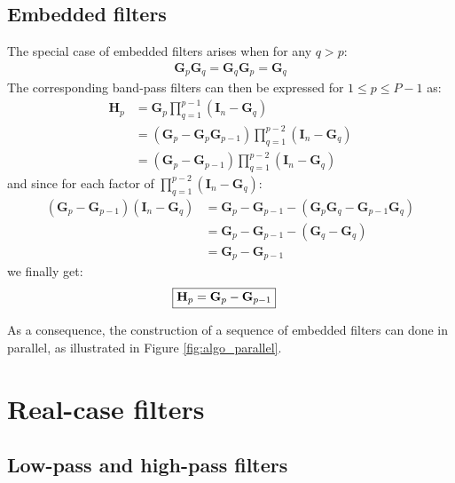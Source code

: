 \documentclass[12pt]{scrartcl}
\begin{document}
\subsection{Embedded filters}
The special case of embedded filters arises when for any $q > p$:
\begin{align}
\label{eq:embedded}
\mathbf{G}_p \mathbf{G}_q = \mathbf{G}_q \mathbf{G}_p = \mathbf{G}_q
\end{align}
The corresponding band-pass filters can then be expressed for $1 \le p \le P-1$ as:
\begin{align}
\mathbf{H}_p & = \mathbf{G}_p \prod_{q=1}^{p-1} \left(\mathbf{I}_n - \mathbf{G}_q\right) \nonumber \\
& = \left(\mathbf{G}_p - \mathbf{G}_p \mathbf{G}_{p-1}\right) \prod_{q=1}^{p-2} \left(\mathbf{I}_n - \mathbf{G}_q\right) \nonumber \\
& = \left(\mathbf{G}_p - \mathbf{G}_{p-1}\right) \prod_{q=1}^{p-2} \left(\mathbf{I}_n - \mathbf{G}_q\right)
\end{align}
and since for each factor of $\displaystyle \prod_{q=1}^{p-2} \left(\mathbf{I}_n - \mathbf{G}_q\right)$:
\begin{align}
\left(\mathbf{G}_p - \mathbf{G}_{p-1}\right) \left(\mathbf{I}_n - \mathbf{G}_q\right) & = \mathbf{G}_p - \mathbf{G}_{p-1} - \left(\mathbf{G}_p \mathbf{G}_q - \mathbf{G}_{p-1} \mathbf{G}_q \right) \nonumber \\
& = \mathbf{G}_p - \mathbf{G}_{p-1} - \left(\mathbf{G}_q - \mathbf{G}_q \right) \nonumber \\
& = \mathbf{G}_p - \mathbf{G}_{p-1}
\end{align}
we finally get:
\begin{align}
\Aboxed{\mathbf{H}_p = \mathbf{G}_p - \mathbf{G}_{p-1}}
\end{align}

As a consequence, the construction of a sequence of embedded filters can done in parallel, as illustrated in Figure \ref{fig:algo_parallel}.

\section{Real-case filters}

\subsection{Low-pass and high-pass filters}
\end{document}
